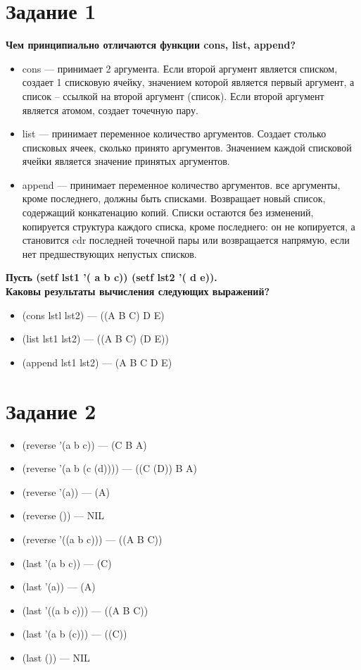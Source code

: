 \documentclass[a4paper,14pt, unknownkeysallowed]{extreport}
\begin{document}


\section*{Задание 1}

\textbf{Чем принципиально отличаются функции cons, list, append?}

\begin{itemize}
	\item cons --- принимает 2 аргумента. Если второй аргумент является списком, создает 1 списковую ячейку, значением которой является первый аргумент, а список -- ссылкой на второй аргумент (список). Если второй аргумент является атомом, создает точечную пару.
	\item list --- принимает переменное количество аргументов. Создает столько списковых ячеек, сколько принято аргументов. Значением каждой списковой ячейки является значение принятых аргументов.
	\item append --- принимает переменное количество аргументов. все аргументы, кроме последнего, должны быть списками. Возвращает новый список, содержащий конкатенацию копий. Списки остаются без изменений, копируется структура каждого списка, кроме последнего: он не копируется, а становится cdr последней точечной пары или возвращается напрямую, если нет предшествующих непустых списков.
\end{itemize}

\textbf{Пусть (setf lst1 '( a b c))
	(setf lst2 '( d e)).\\
	Каковы результаты вычисления следующих выражений?}

\begin{itemize}
	\item (cons lstl lst2) --- ((A B C) D E)
	\item (list lst1 lst2) --- ((A B C) (D E))
	\item (append lst1 lst2) --- (A B C D E)
\end{itemize}

\newpage

\section*{Задание 2}

\begin{itemize}
	\item (reverse '(a b c)) 		--- (C B A) 
	\item (reverse '(a b (c (d))))	--- ((C (D)) B A) 
	\item (reverse '(a)) 			--- (A) 
	\item (reverse ()) 				--- NIL
	\item (reverse '((a b c))) 		--- ((A B C)) 
	\item (last '(a b c)) 			--- (C) 
	\item (last '(a)) 				--- (A) 
	\item (last '((a b c))) 		--- ((A B C)) 
	\item (last '(a b (c))) 		--- ((C)) 
	\item (last ()) 				--- NIL
\end{itemize}
\end{document}
